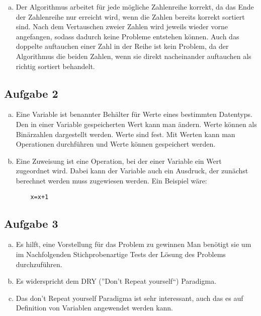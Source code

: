 \documentclass[11pt]{article}
\begin{document}
\begin{enumerate}[a)]
  \item Der Algorithmus arbeitet f\"ur jede m\"ogliche Zahlenreihe korrekt, da 
das Ende der Zahlenreihe nur erreicht wird, wenn die Zahlen bereits korrekt
sortiert sind. Nach dem Vertauschen zweier Zahlen wird jeweils wieder vorne
angefangen, sodass dadurch keine Probleme entstehen k\"onnen. Auch das doppelte
auftauchen einer Zahl in der Reihe ist kein Problem, da der Algorithmus die
beiden Zahlen, wenn sie direkt nacheinander auftauchen als richtig sortiert
behandelt.  
\end{enumerate} 
\subsection*{Aufgabe 2}
\begin{enumerate}[a)]

  \item Eine Variable ist benannter Beh\"alter f\"ur Werte eines bestimmten
    Datentyps. Den in einer Variable gespeicherten Wert kann man \"andern.
    Werte k\"onnen als Bin\"arzahlen dargestellt werden. Werte sind fest. Mit
    Werten kann man Operationen durchf\"uhren und Werte k\"onnen gespeichert
    werden.

  \item Eine Zuweisung ist eine Operation, bei der einer Variable ein Wert
    zugeordnet wird. Dabei kann der Variable auch ein Ausdruck, der zun\"achst
    berechnet werden muss zugewiesen werden. Ein Beispiel w\"are:

    \begin{lstlisting}
    x=x+1
    \end{lstlisting}

\end{enumerate}
\subsection*{Aufgabe 3}
\begin{enumerate}[a)]
  \item Es hilft, eine Vorstellung f\"ur das Problem zu gewinnen Man ben\"otigt
    sie um im Nachfolgenden Stichprobenartige Tests der L\"osung des Problems
    durchzuf\"uhren.

  \item Es widerspricht dem DRY (''Don't Repeat yourself``) Paradigma.

  \item Das don't Repeat yourself Paradigma ist sehr interessant, auch das es
auf Definition von Variablen angewendet werden kann.  

\end{enumerate}
\end{document}
